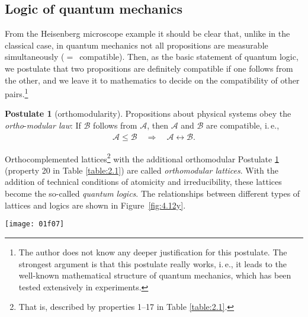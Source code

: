 \documentclass[nochecklpage]{stefan1}
\theoremstyle{definition}
\newtheorem{postulate}[theorem]{Postulate}
\begin{document}
\subsection{Logic of quantum mechanics}\label{ss:qm-logic}
From the Heisenberg microscope example it should be clear that, unlike
in the classical case, in quantum mechanics not all propositions are
measurable simultaneously ($=$~compatible). Then, as the basic statement
of quantum logic, we postulate that two propositions are definitely
compatible if one follows from the other, and we leave it to mathematics
to decide on the compatibility of other pairs.\footnote{The author
does not know any deeper justification for this postulate. The strongest
argument is that this postulate really works, i.\,e., it leads to the
well-known mathematical structure of quantum mechanics, which has been
tested extensively in experiments.}

\begin{postulate}[orthomodularity]
\label{postulateK13}Propositions about physical systems obey the \emph{ortho}-\emph{modular law}:
If $ \mathcal{B} $ follows from $ \mathcal{A} $, then $ \mathcal{A} $
and $ \mathcal{B} $ are compatible, i.\,e.,
%
\begin{align}
\mathcal{A} \leq \mathcal{B} \quad \Rightarrow\quad  \mathcal{A} \leftrightarrow
\mathcal{B}.
\label{eq:orthomodularity}
\end{align}
 \end{postulate}

\nn
Orthocomplemented lattices\footnote{That is, described by properties
1--17 in Table \ref{table:2.1}.} with the additional orthomodular
Postulate \ref{postulateK13} (property 20 in Table \ref{table:2.1}) are
called \emph{orthomodular lattices}. With the
addition of technical conditions of atomicity and irreducibility, these
lattices become the so-called \emph{quantum}
\emph{logics}. The relationships between different types of lattices and
logics are shown in Figure~\ref{fig:4.12y}.

\begin{SCfigure}[50][b!]
\texttt{[image: 01f07]}
\caption{Relationships between different types of lattices and logics.}
\label{fig:4.12y}
\end{SCfigure}

\end{document}
